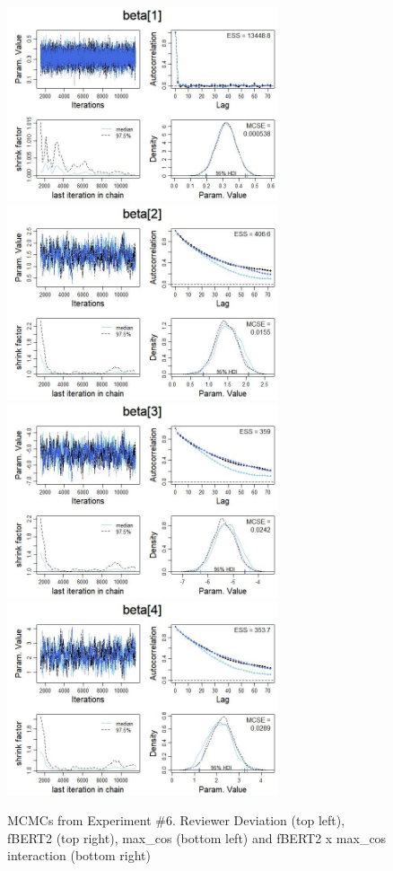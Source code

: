 \documentclass[man, floatsintext, 10pt]{apa6}
\begin{document}
\begin{figure}
\includegraphics[width=8cm]{experiment_6_1.jpg}
\includegraphics[width=8cm]{experiment_6_2.jpg} \\

\includegraphics[width=8cm]{experiment_6_3.jpg}
\includegraphics[width=8cm]{experiment_6_4.jpg}
\caption{MCMCs from Experiment \#6. Reviewer Deviation (top left), fBERT2 (top right), max\_cos (bottom left) and fBERT2 x max\_cos interaction (bottom right)}
  \label{Exp6MCMC}
\end{figure}
\end{document}
